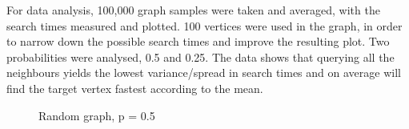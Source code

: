 \documentclass[12pt,a4paper]{article}
\begin{document}
For data analysis, 100,000 graph samples were taken and averaged, with the search times measured and plotted. 100 vertices were used in the graph, in order to narrow down the possible search times and improve the resulting plot. Two probabilities were analysed, 0.5 and 0.25. The data shows that querying all the neighbours yields the lowest variance/spread in search times and on average will find the target vertex fastest according to the mean.
 \newpage
  \begin{figure}[h]
 	\centering
 	\qquad
 	\qquad
	\caption{Random graph, p = 0.5}
 	\label{both}
 \end{figure}
\end{document}
